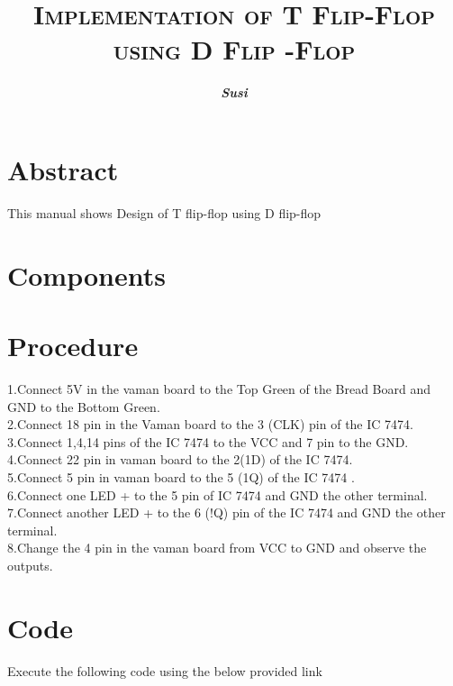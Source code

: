 \documentclass{article}
\title{\textbf{\textsc{Implementation of T Flip-Flop using D Flip -Flop}}}
\author{\textit{\textbf{Susi}}}
\begin{document}
\maketitle
\section{Abstract}
This manual shows Design of T flip-flop using D flip-flop
\section{Components}
\begin{table}[ht]
\caption{}
\label{Tabel-1}
\end{table}
\section{Procedure}
1.Connect 5V  in the vaman board to the Top Green of the Bread Board  and GND to the Bottom Green.
\\
2.Connect 18 pin in the Vaman board to the 3 (CLK) pin of the IC 7474.
\\
3.Connect 1,4,14  pins of the IC 7474 to the VCC and 7 pin to the GND.
\\
4.Connect  22 pin in vaman board  to the  2(1D) of the IC 7474.
\\
5.Connect 5  pin in vaman board to the 5 (1Q) of the IC 7474 .
\\
6.Connect one LED + to the 5 pin of IC 7474 and GND the other terminal.
\\
7.Connect another LED +  to the 6 (!Q) pin of the IC 7474 and GND the other terminal.\\
8.Change the 4 pin in the vaman board from VCC to GND and observe the outputs.
\\

\section{Code}
Execute the following code using the below provided link
\\
\begin{table}[ht]
\end{table}
\end{document}
